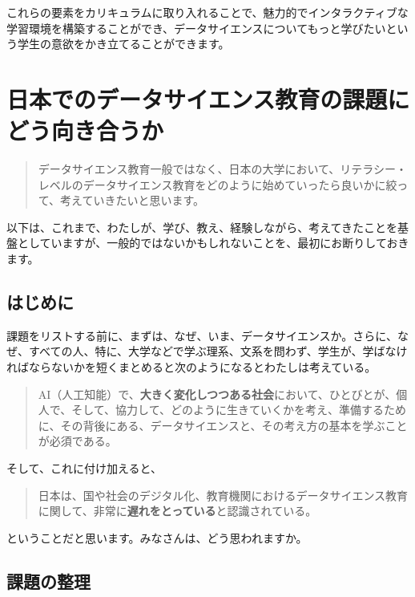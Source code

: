 \documentclass[
]{bxjsbook}
\theoremstyle{definition}
\theoremstyle{definition}
\theoremstyle{definition}
\theoremstyle{definition}
\theoremstyle{remark}
\begin{document}
これらの要素をカリキュラムに取り入れることで、魅力的でインタラクティブな学習環境を構築することができ、データサイエンスについてもっと学びたいという学生の意欲をかき立てることができます。

\hypertarget{issuesinjp}{%
\section{日本でのデータサイエンス教育の課題にどう向き合うか}\label{issuesinjp}}

\begin{quote}
データサイエンス教育一般ではなく、日本の大学において、リテラシー・レベルのデータサイエンス教育をどのように始めていったら良いかに絞って、考えていきたいと思います。
\end{quote}

以下は、これまで、わたしが、学び、教え、経験しながら、考えてきたことを基盤としていますが、一般的ではないかもしれないことを、最初にお断りしておきます。

\hypertarget{ux306fux3058ux3081ux306b-2}{%
\subsection{はじめに}\label{ux306fux3058ux3081ux306b-2}}

課題をリストする前に、まずは、なぜ、いま、データサイエンスか。さらに、なぜ、すべての人、特に、大学などで学ぶ理系、文系を問わず、学生が、学ばなければならないかを短くまとめると次のようになるとわたしは考えている。

\begin{quote}
AI（人工知能）で、\textbf{大きく変化しつつある社会}において、ひとびとが、個人で、そして、協力して、どのように生きていくかを考え、準備するために、その背後にある、データサイエンスと、その考え方の基本を学ぶことが必須である。
\end{quote}

そして、これに付け加えると、

\begin{quote}
日本は、国や社会のデジタル化、教育機関におけるデータサイエンス教育に関して、非常に\textbf{遅れをとっている}と認識されている。
\end{quote}

ということだと思います。みなさんは、どう思われますか。

\hypertarget{ux8ab2ux984cux306eux6574ux7406-1}{%
\subsection{課題の整理}\label{ux8ab2ux984cux306eux6574ux7406-1}}
\end{document}
